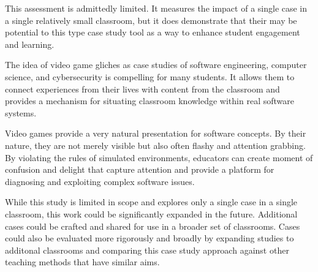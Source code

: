 \documentclass[letterpaper]{article}
\begin{document}
This assessment is admittedly limited. It measures the impact of a single case in a single relatively small classroom, but it does demonstrate that their may be potential to this type case study tool as a way to enhance student engagement and learning.


The idea of video game gliches as case studies of software engineering, computer science, and cybersecurity is compelling for many students. It allows them to connect experiences from their lives with content from the classroom and provides a mechanism for situating classroom knowledge within real software systems.

Video games provide a very natural presentation for software concepts. By their nature, they are not merely visible but also often flashy and attention grabbing. By violating the rules of simulated environments, educators can create moment of confusion and delight that capture attention and provide a platform for diagnosing and exploiting complex software issues.

While this study is limited in scope and explores only a single case in a single classroom, this work could be significantly expanded in the future. Additional cases could be crafted and shared for use in a broader set of classrooms. Cases could also be evaluated more rigorously and broadly by expanding studies to additonal classrooms and comparing this case study approach against other teaching methods that have similar aims.

%
%

\printbibliography
\end{document}
